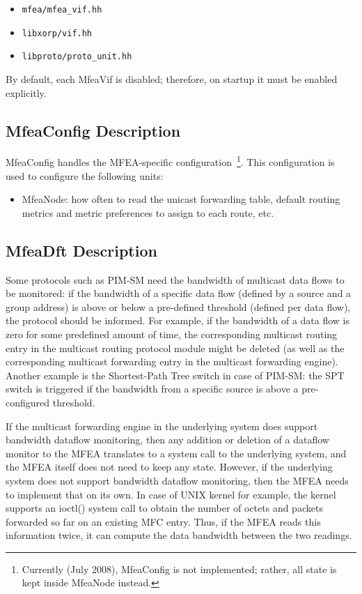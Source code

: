 \documentclass[11pt]{article}
\begin{document}
\begin{itemize}
  \item \verb=mfea/mfea_vif.hh=
  \item \verb=libxorp/vif.hh=
  \item \verb=libproto/proto_unit.hh=
\end{itemize}

By default, each MfeaVif is disabled; therefore, on startup it must be
enabled explicitly.

\subsection{MfeaConfig Description}

MfeaConfig handles the MFEA-specific configuration~\footnote{Currently
(July 2008), MfeaConfig is not implemented; rather, all state is
kept inside MfeaNode instead.}. This configuration is used to configure the
following units:

\begin{itemize}

  \item MfeaNode: how often to read the unicast forwarding table,
  default routing metrics and metric preferences to assign to each
  route, etc.

\end{itemize}

\subsection{MfeaDft Description}

Some protocols such as PIM-SM need the bandwidth of multicast data flows
to be monitored: if the bandwidth of a specific data flow (defined by
a source and a group address) is above or below a pre-defined threshold
(defined per data flow), the protocol should be informed. For example, if the
bandwidth of a data flow is zero for some predefined amount of time, the
corresponding multicast routing entry in the multicast routing protocol
module might be deleted (as well as the corresponding multicast
forwarding entry in the multicast forwarding engine). Another example is
the Shortest-Path Tree switch in case of PIM-SM: the SPT switch is
triggered if the bandwidth from a specific source is above a
pre-configured threshold.

If the multicast forwarding engine in the underlying system does
support bandwidth dataflow monitoring, then any addition or
deletion of a dataflow monitor to the MFEA translates to a system call
to the underlying system, and the MFEA itself does not need to keep any
state. However, if the underlying system does not support bandwidth
dataflow monitoring, then the MFEA needs to implement that on its own.
In case of UNIX kernel for example, the kernel supports an ioctl()
system call to obtain the number of octets and packets forwarded so far on
an existing MFC entry. Thus, if the MFEA reads this information twice,
it can compute the data bandwidth between the two readings.
\end{document}
